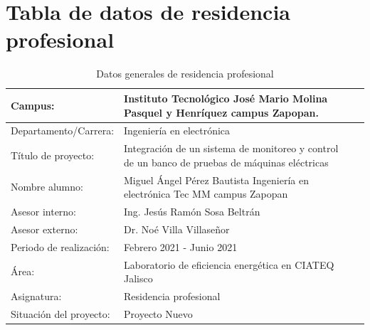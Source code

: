\documentclass[12pt,titlepage]{article}
\begin{document}
\section{Tabla de datos de residencia profesional}
\begin{table}[!h]

\begin{center}
\begin{tabular}{ | m{15em} | m{22em}| m{35em} | } 
\hline
Campus: & \vspace{5mm} Instituto Tecnológico José Mario Molina Pasquel y Henríquez campus Zapopan.  \\[3.5mm]
\hline
Departamento/Carrera: & \vspace{5mm} Ingeniería en electrónica  \\ [3.5mm]
\hline
Título de proyecto: & \vspace{5mm} Integración de un sistema de monitoreo y control de un banco de pruebas de máquinas eléctricas \\[2.5mm]
\hline
Nombre alumno: & \vspace{5mm} Miguel Ángel Pérez Bautista \newline 16011804 \newline Ingeniería en electrónica \newline Tec MM campus Zapopan \\ [3.5mm]
\hline
Asesor interno: & \vspace{5mm} Ing. Jesús Ramón Sosa Beltrán \newline   \\ [3.5mm]
\hline
Asesor externo: & \vspace{5mm} Dr. Noé Villa Villaseñor  \\ [3.5mm]
\hline
Periodo de realización: & \vspace{5mm} Febrero 2021 - Junio 2021  \\  [3.5mm]
\hline
Área: & \vspace{5mm} Laboratorio de eficiencia energética en CIATEQ Jalisco  \\  [3.5mm]
\hline
Asignatura: & \vspace{5mm} Residencia profesional  \\  [3.5mm]
\hline
Situación del proyecto: & \vspace{5mm}  Proyecto Nuevo  \\  [3.5mm]
\hline
\end{tabular}
\end{center}
\caption{Datos generales de residencia profesional}
\label{tabla:1}
\end{table}
\newpage
\end{document}
